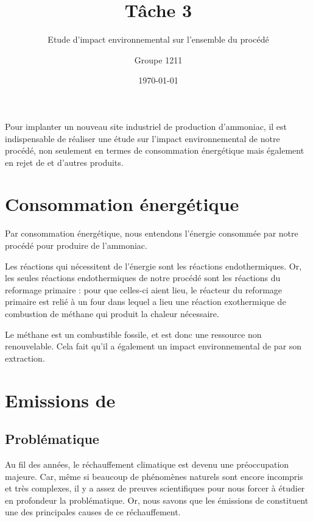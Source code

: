 \documentclass[a4paper, oneside]{scrartcl}
\begin{document}
\titlehead{}
\subject{}
\title{Tâche 3}
\subtitle{ Etude d’impact environnemental sur l’ensemble du procédé }
\author{Groupe 1211}
\publishers{}
\date{\today}

\dedication{}

\maketitle

Pour implanter un nouveau site industriel de production d'ammoniac, il est indispensable de réaliser une étude sur l'impact environnemental de notre procédé, non seulement en termes de consommation énergétique mais également en rejet de  et d'autres produits.

\section{Consommation énergétique}
Par consommation énergétique, nous entendons l'énergie consommée par notre procédé pour produire de l'ammoniac.
 

Les réactions qui nécessitent de l'énergie sont les réactions endothermiques. Or, les seules réactions endothermiques de notre procédé sont les réactions du reformage primaire : pour que celles-ci aient lieu, le réacteur du reformage primaire est relié à un four dans lequel a lieu une réaction exothermique de combustion de méthane qui produit la chaleur nécessaire.
 

Le méthane est un combustible fossile, et est donc une ressource non renouvelable. Cela fait qu'il a également un impact environnemental de par son extraction.

\section{Emissions de \texorpdfstring{}{CO \texttwoinferior}}
\subsection{Problématique \cite{prob1} \cite{changclim}}
Au fil des années, le réchauffement climatique est devenu une préoccupation majeure. Car, même si beaucoup de phénomènes naturels sont encore incompris et très complexes, il y a assez de preuves scientifiques pour nous forcer à étudier en profondeur la problématique. Or, nous savons que les émissions de  constituent une des principales causes de ce réchauffement. 
 
\end{document}
